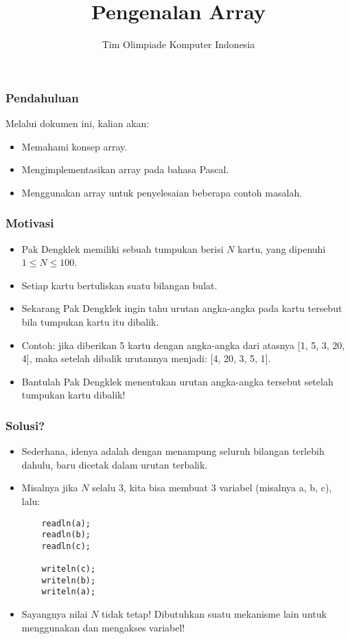 \documentclass{beamer}
\title{Pengenalan Array}
\author{Tim Olimpiade Komputer Indonesia}
\begin{document}
\begin{frame}
\titlepage
\end{frame}

\begin{frame}
\frametitle{Pendahuluan}
Melalui dokumen ini, kalian akan:
\begin{itemize}
	\item Memahami konsep array.
	\item Mengimplementasikan array pada bahasa Pascal.
	\item Menggunakan array untuk penyelesaian beberapa contoh masalah.
\end{itemize}
\end{frame}

\begin{frame}
\frametitle{Motivasi}
\begin{itemize}
	\item Pak Dengklek memiliki sebuah tumpukan berisi $N$ kartu, yang dipenuhi $1 \le N \le 100$.
	\item Setiap kartu bertuliskan suatu bilangan bulat.
	\item Sekarang Pak Dengklek ingin tahu urutan angka-angka pada kartu tersebut bila tumpukan kartu itu dibalik.
	\item Contoh: jika diberikan 5 kartu dengan angka-angka dari atasnya [1, 5, 3, 20, 4], maka setelah dibalik urutannya menjadi: [4, 20, 3, 5, 1].
	\item Bantulah Pak Dengklek menentukan urutan angka-angka tersebut setelah tumpukan kartu dibalik!
\end{itemize}
\end{frame}

\begin{frame}[fragile]
\frametitle{Solusi?}
\begin{itemize}
	\item Sederhana, idenya adalah dengan menampung seluruh bilangan terlebih dahulu, baru dicetak dalam urutan terbalik.
	\item Misalnya jika $N$ selalu 3, kita bisa membuat 3 variabel (misalnya a, b, c), lalu:
	\begin{lstlisting}
	readln(a);
	readln(b);
	readln(c);
	
	writeln(c);
	writeln(b);
	writeln(a);
	\end{lstlisting}
	\item Sayangnya nilai $N$ tidak tetap! Dibutuhkan suatu mekanisme lain untuk menggunakan dan mengakses variabel!
\end{itemize}
\end{frame}
\end{document}
